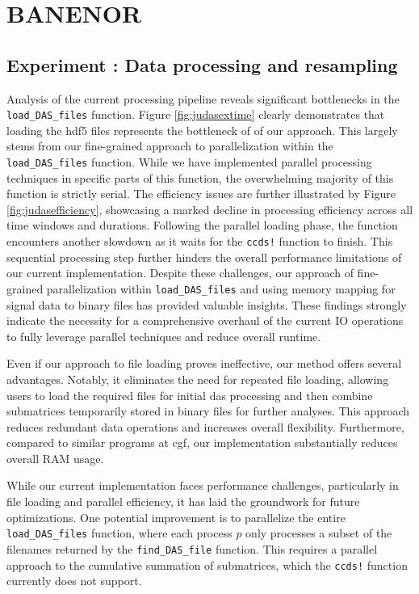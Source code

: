 \section{BANENOR}
\label{disc:banenor}

\subsection{Experiment : Data processing and resampling}

Analysis of the current processing pipeline reveals significant bottlenecks in the \texttt{load\_DAS\_files} function. Figure \ref{fig:judasextime} clearly demonstrates that loading the \acrshort{hdf5} files represents the bottleneck of of our approach. This largely stems from our fine-grained approach to parallelization within the \texttt{load\_DAS\_files} function. While we have implemented parallel processing techniques in specific parts of this function, the overwhelming majority of this function is strictly serial. The efficiency issues are further illustrated by Figure \ref{fig:judasefficiency}, showcasing a marked decline in processing efficiency across all time windows and durations.
Following the parallel loading phase, the function encounters another slowdown as it waits for the \texttt{ccds!} function to finish. This sequential processing step further hinders the overall performance limitations of our current implementation.
Despite these challenges, our approach of fine-grained parallelization within \texttt{load\_DAS\_files} and using memory mapping for signal data to binary files has provided valuable insights. These findings strongly indicate the necessity for a comprehensive overhaul of the current IO operations to fully leverage parallel techniques and reduce overall runtime.

Even if our approach to file loading proves ineffective, our method offers several advantages. Notably, it eliminates the need for repeated file loading, allowing users to load the required files for initial \acrshort{das} processing and then combine submatrices temporarily stored in binary files for further analyses. This approach reduces redundant data operations and increases overall flexibility. Furthermore, compared to similar programs at \acrshort{cgf}, our implementation substantially reduces overall RAM usage.

While our current implementation faces performance challenges, particularly in file loading and parallel efficiency, it has laid the groundwork for future optimizations. One potential improvement is to parallelize the entire \texttt{load\_DAS\_files} function, where each process $p$ only processes a subset of the filenames returned by the \texttt{find\_DAS\_file} function. This requires a parallel approach to the cumulative summation of submatrices, which the \texttt{ccds!} function currently does not support.


